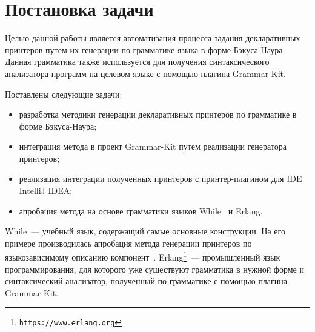 \section{Постановка задачи}

Целью данной работы является автоматизация процесса задания декларативных принтеров путем их генерации по грамматике языка в форме Бэкуса-Наура.
Данная грамматика также используется для получения синтаксического анализатора программ на целевом языке с помощью плагина Grammar-Kit. 

Поставлены следующие задачи:
\begin{itemize}
    \item разработка методики генерации декларативных принтеров по грамматике в форме Бэкуса-Наура;
    \item интеграция метода в проект Grammar-Kit путем реализации генератора принтеров;
    \item реализация интеграции полученных принтеров с принтер-плагином для IDE IntelliJ IDEA;
    \item апробация метода на основе грамматики языков While~\cite{paper:nielson} и Erlang.
\end{itemize}
While~--- учебный язык, содержащий самые основные конструкции.
На его примере производилась апробация метода генерации принтеров по языкозависимому описанию компонент~\cite{paper:while}. 
Erlang\footnote{\texttt{https://www.erlang.org}}~--- промышленный язык программирования, для которого уже существуют
грамматика в нужной форме и синтаксический анализатор, полученный по грамматике с помощью плагина Grammar-Kit.

